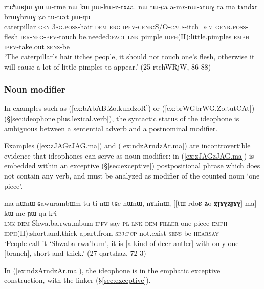 \begin{exe}
\ex \label{ex:brWGbrWG.Zo.tutCAt}
\gll rtɕʰɯʁjɯ ɣɯ ɯ-rme nɯ kɯ ɲɯ-kɯ-z-rɤʑa. nɯ tɯ-ɕa a-mɤ-nɯ-ɤtɯɣ ra ma tɤndɤr brɯɣbrɯɣ ʑo tu-tɕɤt ɲɯ-ŋu  \\
caterpillar \textsc{gen} \textsc{3sg}.\textsc{poss}-hair \textsc{dem} \textsc{erg} \textsc{ipfv}-\textsc{genr}:S/O-\textsc{caus}-itch \textsc{dem} \textsc{genr}.\textsc{poss}-flesh \textsc{irr}-\textsc{neg}-\textsc{pfv}-touch be.needed:\textsc{fact} \textsc{lnk} pimple \textsc{idph}(II):little.pimples \textsc{emph} \textsc{ipfv}-take.out \textsc{sens}-be \\
\glt `The caterpillar's hair itches people, it should not touch one's flesh, otherwise it will cause a lot of little pimples to appear.' (25-rtchWRjW, 86-88)
\end{exe}
 
  
 \subsubsection{Noun modifier} \label{sec:ideophone.noun.modifier}
 In examples such as (\ref{ex:bAbAB.Zo.kundzoR}) or (\ref{ex:brWGbrWG.Zo.tutCAt}) (§\ref{sec:ideophone.plus.lexical.verb}), the syntactic status of the ideophone is ambiguous between a sentential adverb and a postnominal modifier. 
 
 Examples (\ref{ex:zJAGzJAG.ma}) and (\ref{ex:ndzArndzAr.ma}) are incontrovertible evidence that ideophones can serve as noun modifier: in (\ref{ex:zJAGzJAG.ma}) is embedded within an exceptive (§\ref{sec:exceptive}) postpositional phrase which does not contain any verb, and must be analyzed as modifier of the counted noun  `one piece'.
 
\begin{exe}
\ex \label{ex:zJAGzJAG.ma}
\gll ma nɯnɯ ɕawurambɯm tu-ti-nɯ tɕe nɯnɯ, nɤkinɯ, [[tɯ-rdoʁ ʑo \textbf{zɟɤɣzɟɤɣ}] ma] kɯ-me ɲɯ-ŋu kʰi \\
\textsc{lnk} \textsc{dem} Shwa.ba.rwa.mbum \textsc{ipfv}-say-\textsc{pl} \textsc{lnk} \textsc{dem} \textsc{filler} one-piece \textsc{emph} \textsc{idph}(II):short.and.thick apart.from \textsc{sbj}:\textsc{pcp}-not.exist \textsc{sens}-be \textsc{hearsay} \\
\glt `People call it `Shwaba rwa'bum', it is [a kind of deer antler] with only one [branch], short and thick.'  
 (27-qartshaz, 72-3)
\end{exe}

In (\ref{ex:ndzArndzAr.ma}), the ideophone  is in the emphatic exceptive construction, with the linker  (§\ref{sec:exceptive}).

